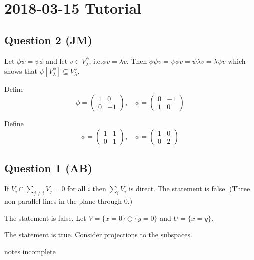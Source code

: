 \section{2018-03-15 Tutorial}

\subsection*{Question 2 (JM)}

\begin{enumerate}
	
	\io
	Let $\phi\psi=\psi\phi$ and let $v \in V_\lambda^\phi$, i.e.\@ $\phi v=\lambda v$.
	Then $\phi\psi v = \psi\phi v = \psi\lambda v = \lambda\psi v$ which shows that $\psi[V_\lambda^\phi] \subseteq V_\lambda^\phi$.

	\io
	Define
	\[
		\phi=
		\begin{pmatrix}
			1 & 0 \\
			0 & -1
		\end{pmatrix}
		,\quad
		\phi=
		\begin{pmatrix}
		0 & -1 \\
		1 & 0
		\end{pmatrix}
	\]

	\io
	Define
	\[
		\phi=
		\begin{pmatrix}
		1 & 1 \\
		0 & 1
		\end{pmatrix}
		,\quad
		\phi=
		\begin{pmatrix}
		1 & 0 \\
		0 & 2
		\end{pmatrix}
	\]

\end{enumerate}

\subsection*{Question 1 (AB)}

\begin{enumerate}
	
	\io
	If $V_i \cap \sum_{j \neq i} V_j = 0$ for all $i$ then $\sum_i V_i$ is direct.
	The statement is false.
	(Three non-parallel lines in the plane through 0.)
	
	\io
	The statement is false.
	Let $V = \{x=0\} \oplus \{y=0\}$ and $U = \{x=y\}$.
	
	\io
	The statement is true.
	Consider projections to the subspaces.
	
\end{enumerate}

notes incomplete
